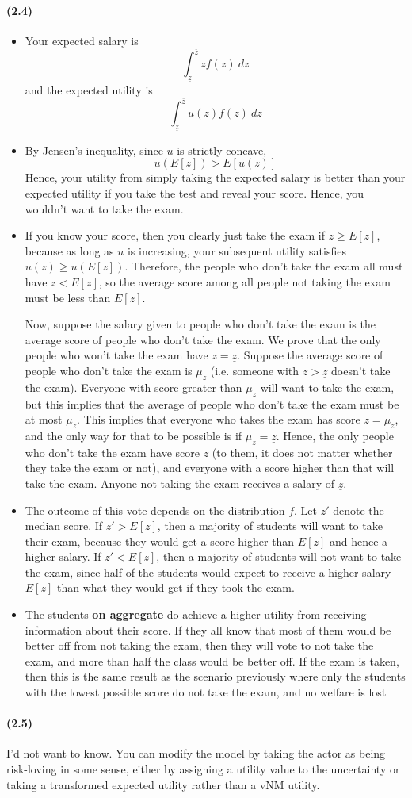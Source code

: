 \documentclass[10pt,letter]{article}
\begin{document}
\paragraph{(2.4)}
\begin{itemize}
\item Your expected salary is
\[ \int_{\underline{z}}^{\overline{z}} z f(z) \ dz \]
and the expected utility is
\[ \int_{\underline{z}}^{\overline{z}} u(z) f(z) \ dz \]
\item By Jensen's inequality, since $u$ is strictly concave,
\[ u(E[z]) > E[u(z)]  \]
Hence, your utility from simply taking the expected salary is better than your expected utility if you take the test and reveal your score. Hence, you wouldn't want to take the exam.
\item If you know your score, then you clearly just take the exam if $z \ge E[z]$, because as long as $u$ is increasing, your subsequent utility satisfies $u(z) \ge u(E[z])$. Therefore, the people who don't take the exam all must have $z < E[z]$, so the average score among all people not taking the exam must be less than $E[z]$.

Now, suppose the salary given to people who don't take the exam is the average score of people who don't take the exam. We prove that the only people who won't take the exam have $z = \underline{z}$. Suppose the average score of people who don't take the exam is $\mu_z$ (i.e. someone with $z > \underline{z}$ doesn't take the exam). Everyone with score greater than $\mu_z$ will want to take the exam, but this implies that the average of people who don't take the exam must be at most $\mu_z$. This implies that everyone who takes the exam has score $z = \mu_z$, and the only way for that to be possible is if $\mu_z = \underline{z}$. Hence, the only people who don't take the exam have score $\underline{z}$ (to them, it does not matter whether they take the exam or not), and everyone with a score higher than that will take the exam. Anyone not taking the exam receives a salary of $\underline{z}$.
\item The outcome of this vote depends on the distribution $f$. Let $z'$ denote the median score. If $z' > E[z]$, then a majority of students will want to take their exam, because they would get a score higher than $E[z]$ and hence a higher salary. If $z' < E[z]$, then a majority of students will not want to take the exam, since half of the students would expect to receive a higher salary $E[z]$ than what they would get if they took the exam.
\item The students \textbf{on aggregate} do achieve a higher utility from receiving information about their score. If they all know that most of them would be better off from not taking the exam, then they will vote to not take the exam, and more than half the class would be better off. If the exam is taken, then this is the same result as the scenario previously where only the students with the lowest possible score do not take the exam, and no welfare is lost
\end{itemize}
\paragraph{(2.5)}
I'd not want to know. You can modify the model by taking the actor as being risk-loving in some sense, either by assigning a utility value to the uncertainty or taking a transformed expected utility rather than a vNM utility.
\end{document}
